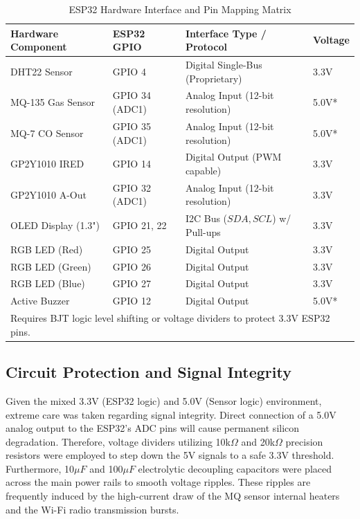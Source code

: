 \documentclass[12pt,journal,onecolumn,a4paper]{IEEEtran}
\begin{document}
\begin{table}[htbp]
\centering
\caption{ESP32 Hardware Interface and Pin Mapping Matrix}
\begin{tabularx}{\textwidth}{@{} l l X l @{}}
\toprule
\textbf{Hardware Component} & \textbf{ESP32 GPIO} & \textbf{Interface Type / Protocol} & \textbf{Voltage} \\ \midrule
DHT22 Sensor & GPIO 4 & Digital Single-Bus (Proprietary) & 3.3V \\
MQ-135 Gas Sensor & GPIO 34 (ADC1) & Analog Input (12-bit resolution) & 5.0V* \\
MQ-7 CO Sensor & GPIO 35 (ADC1) & Analog Input (12-bit resolution) & 5.0V* \\
GP2Y1010 IRED & GPIO 14 & Digital Output (PWM capable) & 3.3V \\
GP2Y1010 A-Out & GPIO 32 (ADC1) & Analog Input (12-bit resolution) & 3.3V \\
OLED Display (1.3") & GPIO 21, 22 & I2C Bus ($SDA, SCL$) w/ Pull-ups & 3.3V \\
RGB LED (Red) & GPIO 25 & Digital Output & 3.3V \\
RGB LED (Green) & GPIO 26 & Digital Output & 3.3V \\
RGB LED (Blue) & GPIO 27 & Digital Output & 3.3V \\
Active Buzzer & GPIO 12 & Digital Output & 5.0V* \\ \bottomrule
\multicolumn{4}{l}{\footnotesize *Requires BJT logic level shifting or voltage dividers to protect 3.3V ESP32 pins.}
\end{tabularx}
\end{table}

\subsection{Circuit Protection and Signal Integrity}
Given the mixed 3.3V (ESP32 logic) and 5.0V (Sensor logic) environment, extreme care was taken regarding signal integrity. Direct connection of a 5.0V analog output to the ESP32's ADC pins will cause permanent silicon degradation. Therefore, voltage dividers utilizing 10k$\Omega$ and 20k$\Omega$ precision resistors were employed to step down the 5V signals to a safe 3.3V threshold. 
Furthermore, 10$\mu F$ and 100$\mu F$ electrolytic decoupling capacitors were placed across the main power rails to smooth voltage ripples. These ripples are frequently induced by the high-current draw of the MQ sensor internal heaters and the Wi-Fi radio transmission bursts.
\end{document}
